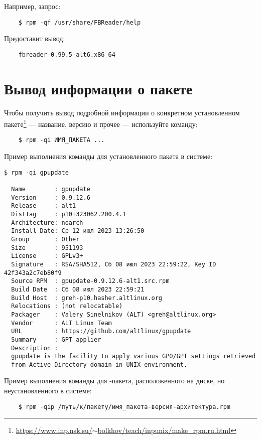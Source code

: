 Например, запрос:
\begin{verbatim}
    $ rpm -qf /usr/share/FBReader/help
\end{verbatim}
Предоставит вывод:
\begin{verbatim}
    fbreader-0.99.5-alt6.x86_64
\end{verbatim}

\section{Вывод информации о пакете}
Чтобы получить вывод подробной информации о конкретном установленном 
пакете\footnote{\href{https://www.inp.nsk.su/~bolkhov/teach/inpunix/make_rpm.ru.html}{https://www.inp.nsk.su/$\sim$bolkhov/teach/inpunix/make\_rpm.ru.html}} 
--- название, версию и прочее --- используйте команду:
\begin{verbatim}
    $ rpm -qi ИМЯ_ПАКЕТА ...
\end{verbatim}




Пример выполнения команды для установленного пакета в системе:
\begin{verbatim}
$ rpm -qi gpupdate

  Name        : gpupdate
  Version     : 0.9.12.6
  Release     : alt1
  DistTag     : p10+323062.200.4.1
  Architecture: noarch
  Install Date: Ср 12 июл 2023 13:26:50
  Group       : Other
  Size        : 951193
  License     : GPLv3+
  Signature   : RSA/SHA512, Сб 08 июл 2023 22:59:22, Key ID 42f343a2c7eb80f9
  Source RPM  : gpupdate-0.9.12.6-alt1.src.rpm
  Build Date  : Сб 08 июл 2023 22:59:21
  Build Host  : greh-p10.hasher.altlinux.org
  Relocations : (not relocatable)
  Packager    : Valery Sinelnikov (ALT) <greh@altlinux.org>
  Vendor      : ALT Linux Team
  URL         : https://github.com/altlinux/gpupdate
  Summary     : GPT applier
  Description :
  gpupdate is the facility to apply various GPO/GPT settings retrieved
  from Active Directory domain in UNIX environment.
\end{verbatim}

Пример выполнения команды для -пакета, расположенного на диске, но неустановленного в системе:
\begin{verbatim}
    $ rpm -qip /путь/к/пакету/имя_пакета-версия-архитектура.rpm
\end{verbatim}

